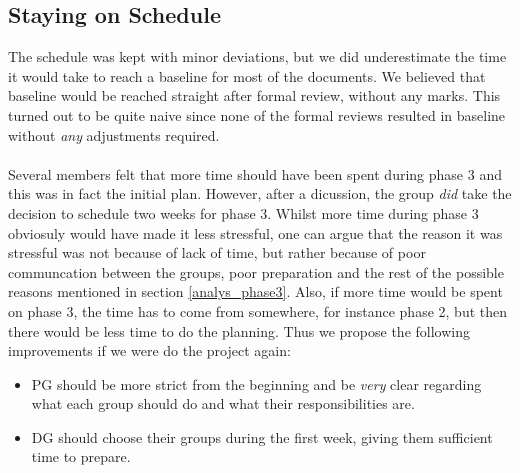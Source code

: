 \documentclass{article}
\begin{document}
    \subsection{Staying on Schedule \label{analyse_schedule}}
        The schedule was kept with minor deviations, but we did underestimate the time it would take
        to reach a baseline for most of the documents. We believed that baseline would be reached straight
        after formal review, without any marks. This turned out to be quite naive since none of the formal reviews resulted in baseline without \emph{any} adjustments required.
        \\ \\
        Several members felt that more time should have been spent during phase 3 and
        this was in fact the initial plan. However, after a dicussion, the group \emph{did} take
        the decision to schedule two weeks for phase 3. Whilst more time during phase 3
        obviosuly would have made it less stressful, one can argue that the reason it was stressful
        was not because of lack of time, but rather because of poor communcation between the groups,
        poor preparation and the rest of the possible reasons mentioned in section \ref{analys_phase3}. Also,
        if more time would be spent on phase 3, the time has to come from somewhere, for instance phase 2, but then there
        would be less time to do the planning. Thus we propose the following improvements if we were do the project again:
        \begin{itemize}
            \item PG should be more strict from the beginning and be \emph{very} clear regarding what each group
                    should do and what their responsibilities are. 
            \item DG should choose their groups during the first week, giving them sufficient time to prepare.
        \end{itemize}
\end{document}
